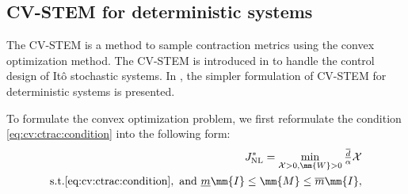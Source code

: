 \subsection{CV-STEM for deterministic systems}
\label{sec:cv:cvstem}

The CV-STEM is a method to sample contraction metrics using the convex optimization method.
The CV-STEM is introduced in \cite{Tsukamoto:2019aa,Tsukamoto:2021ad} to handle the control design of It\^{o} stochastic systems.
In \cite{Tsukamoto:2021ae}, the simpler formulation of CV-STEM  for deterministic systems is presented.

To formulate the convex optimization problem, we first reformulate the condition \eqref{eq:cv:ctrac:condition} into the following form:
\begin{align}
    J_{\rm NL}^*
    =
    \min_{
        \mathcal{X}>0,\mm{W}>0
    }
    \tfrac{\overline{d}}{\alpha}
    \mathcal{X}
    \\
    \text{s.t.}
    \eqref{eq:cv:ctrac:condition} 
    ,
    {\ \rm and \ }
    \underline{m}\mm{I} \leq \mm{M} \leq \overline{m}\mm{I}
    ,
    \label{eq:cv:cvstem:opt}
\end{align}


